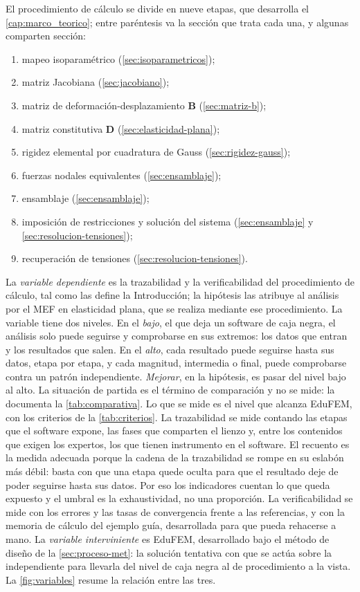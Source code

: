 El procedimiento de cálculo se divide en nueve etapas, que desarrolla el \autoref{cap:marco_teorico}; entre paréntesis va la sección que trata cada una, y algunas comparten sección:
\begin{enumerate}
    \item mapeo isoparamétrico (\autoref{sec:isoparametricos});
    \item matriz Jacobiana (\autoref{sec:jacobiano});
    \item matriz de deformación-desplazamiento $\bm{B}$ (\autoref{sec:matriz-b});
    \item matriz constitutiva $\bm{D}$ (\autoref{sec:elasticidad-plana});
    \item rigidez elemental por cuadratura de Gauss (\autoref{sec:rigidez-gauss});
    \item fuerzas nodales equivalentes (\autoref{sec:ensamblaje});
    \item ensamblaje (\autoref{sec:ensamblaje});
    \item imposición de restricciones y solución del sistema (\autoref{sec:ensamblaje} y \autoref{sec:resolucion-tensiones});
    \item recuperación de tensiones (\autoref{sec:resolucion-tensiones}).
\end{enumerate}

La \emph{variable dependiente} es la trazabilidad y la verificabilidad del procedimiento de cálculo, tal como las define la Introducción; la hipótesis las atribuye al análisis por el MEF en elasticidad plana, que se realiza mediante ese procedimiento. La variable tiene dos niveles. En el \emph{bajo}, el que deja un software de caja negra, el análisis solo puede seguirse y comprobarse en sus extremos: los datos que entran y los resultados que salen. En el \emph{alto}, cada resultado puede seguirse hasta sus datos, etapa por etapa, y cada magnitud, intermedia o final, puede comprobarse contra un patrón independiente. \emph{Mejorar}, en la hipótesis, es pasar del nivel bajo al alto. La situación de partida es el término de comparación y no se mide: la documenta la \autoref{tab:comparativa}. Lo que se mide es el nivel que alcanza EduFEM, con los criterios de la \autoref{tab:criterios}. La trazabilidad se mide contando las etapas que el software expone, las fases que comparten el lienzo y, entre los contenidos que exigen los expertos, los que tienen instrumento en el software. El recuento es la medida adecuada porque la cadena de la trazabilidad se rompe en su eslabón más débil: basta con que una etapa quede oculta para que el resultado deje de poder seguirse hasta sus datos. Por eso los indicadores cuentan lo que queda expuesto y el umbral es la exhaustividad, no una proporción. La verificabilidad se mide con los errores y las tasas de convergencia frente a las referencias, y con la memoria de cálculo del ejemplo guía, desarrollada para que pueda rehacerse a mano. La \emph{variable interviniente} es EduFEM, desarrollado bajo el método de diseño de la \autoref{sec:proceso-met}: la solución tentativa con que se actúa sobre la independiente para llevarla del nivel de caja negra al de procedimiento a la vista. La \autoref{fig:variables} resume la relación entre las tres.

